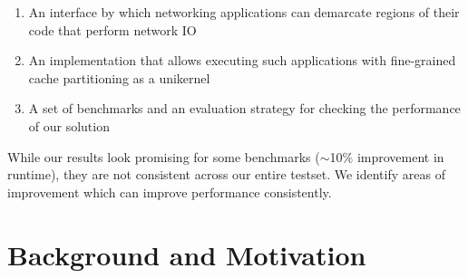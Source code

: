 \documentclass[sigconf,authorversion,noacm]{acmart}
\begin{document}
\begin{enumerate}
    \item An interface by which networking applications can demarcate regions of
        their code that perform network IO
    \item An implementation that allows executing such applications with
        fine-grained cache partitioning as a unikernel
    \item A set of benchmarks and an evaluation strategy for checking the
        performance of our solution
\end{enumerate}

While our results look promising for some benchmarks ($\sim$10$\%$ improvement
in runtime), they are not consistent across our entire testset. We identify
areas of improvement which can improve performance consistently.

\section{Background and Motivation}
\end{document}
